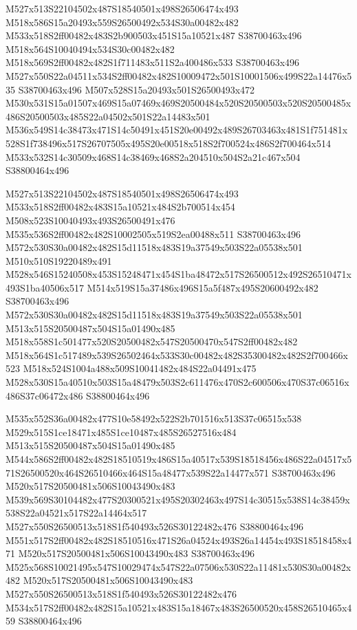 \documentclass{article}
\begin{document}
\begin{multicols}{2}
M527x513S22104502x487S18540501x498S26506474x493 M518x586S15a20493x559S26500492x534S30a00482x482 M533x518S2ff00482x483S2b900503x451S15a10521x487 S38700463x496 M518x564S10040494x534S30c00482x482 M518x569S2ff00482x482S1f711483x511S2a400486x533 S38700463x496 M527x550S22a04511x534S2ff00482x482S10009472x501S10001506x499S22a14476x535 S38700463x496 M507x528S15a20493x501S26500493x472 M530x531S15a01507x469S15a07469x469S20500484x520S20500503x520S20500485x486S20500503x485S22a04502x501S22a14483x501 M536x549S14c38473x471S14c50491x451S20e00492x489S26703463x481S1f751481x528S1f738496x517S26707505x495S20e00518x518S2f700524x486S2f700464x514 M533x532S14c30509x468S14c38469x468S2a204510x504S2a21c467x504 S38800464x496

M527x513S22104502x487S18540501x498S26506474x493 M533x518S2ff00482x483S15a10521x484S2b700514x454 M508x523S10040493x493S26500491x476 M535x536S2ff00482x482S10002505x519S2ea00488x511 S38700463x496 M572x530S30a00482x482S15d11518x483S19a37549x503S22a05538x501 M510x510S19220489x491 M528x546S15240508x453S15248471x454S1ba48472x517S26500512x492S26510471x493S1ba40506x517 M514x519S15a37486x496S15a5f487x495S20600492x482 S38700463x496 M572x530S30a00482x482S15d11518x483S19a37549x503S22a05538x501 M513x515S20500487x504S15a01490x485 M518x558S1c501477x520S20500482x547S20500470x547S2ff00482x482 M518x564S1c517489x539S26502464x533S30c00482x482S35300482x482S2f700466x523 M518x524S1004a488x509S10041482x484S22a04491x475 M528x530S15a40510x503S15a48479x503S2c611476x470S2c600506x470S37c06516x486S37c06472x486 S38800464x496

M535x552S36a00482x477S10e58492x522S2b701516x513S37c06515x538 M529x515S1ce18471x485S1ce10487x485S26527516x484 M513x515S20500487x504S15a01490x485 M544x586S2ff00482x482S18510519x486S15a40517x539S18518456x486S22a04517x571S26500520x464S26510466x464S15a48477x539S22a14477x571 S38700463x496 M520x517S20500481x506S10043490x483 M539x569S30104482x477S20300521x495S20302463x497S14c30515x538S14c38459x538S22a04521x517S22a14464x517 M527x550S26500513x518S1f540493x526S30122482x476 S38800464x496 M551x517S2ff00482x482S18510516x471S26a04524x493S26a14454x493S18518458x471 M520x517S20500481x506S10043490x483 S38700463x496 M525x568S10021495x547S10029474x547S22a07506x530S22a11481x530S30a00482x482 M520x517S20500481x506S10043490x483 M527x550S26500513x518S1f540493x526S30122482x476 M534x517S2ff00482x482S15a10521x483S15a18467x483S26500520x458S26510465x459 S38800464x496


\end{multicols}
\end{document}
